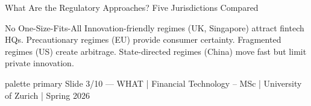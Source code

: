 \documentclass[aspectratio=169, 11pt]{beamer}
\newcommand{\bottomnote}[1]{%
  \vfill
  \begin{beamercolorbox}[wd=\textwidth,ht=2ex,dp=1ex]{palette primary}
    \tiny\hspace{1em}#1
  \end{beamercolorbox}}
\begin{document}
\begin{frame}{What Are the Regulatory Approaches? Five Jurisdictions Compared}
\vspace{0.05em}
\begin{block}{No One-Size-Fits-All}
\scriptsize Innovation-friendly regimes (UK, Singapore) attract fintech HQs. Precautionary regimes (EU) provide consumer certainty. Fragmented regimes (US) create arbitrage. State-directed regimes (China) move fast but limit private innovation.
\end{block}

\bottomnote{Slide 3/10 --- WHAT | Financial Technology -- MSc | University of Zurich | Spring 2026}
\end{frame}

\end{document}
